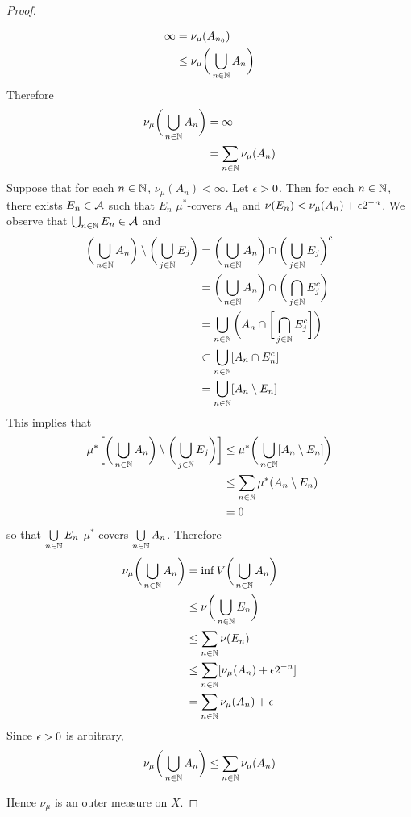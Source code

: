 \documentclass{book}
\begin{document}
\begin{proof}
\begin{enumerate}
\begin{align*}
				\infty 
				& = \nu_{\mu}(A_{n_0}) \\
				& \leq \nu_{\mu}\bigg(  \bigcup\limits_{n \in \mathbb{N}}A_n \bigg)
			\end{align*}
			Therefore
			\begin{align*}
				\nu_{\mu} \bigg( \bigcup_{n \in \mathbb{N}} A_n \bigg)
				& = \infty \\
				& = \sum_{n \in \mathbb{N}} \nu_{\mu}(A_n)
			\end{align*}
			Suppose that for each $n \in \mathbb{N}$, $\nu_{\mu}(A_n) < \infty$. Let $\epsilon > 0$. Then for each $n \in \mathbb{N}$, there exists $E_n \in \mathcal{A}$ such that $E_n$ $\mu^*$-covers $A_n$ and $\nu(E_n) < \nu_{\mu}(A_n) + \epsilon 2^{-n}$. We observe that $\bigcup_{n \in \mathbb{N}} E_n \in \mathcal{A}$ and 
			\begin{align*}
				\bigg( \bigcup_{n \in \mathbb{N}} A_n \bigg)  \setminus  \bigg( \bigcup_{j \in \mathbb{N}} E_j \bigg)
				& =  \bigg( \bigcup_{n \in \mathbb{N}} A_n \bigg) \cap 	\bigg( \bigcup_{j \in \mathbb{N}} E_j \bigg)^c \\
				& =  \bigg( \bigcup_{n \in \mathbb{N}} A_n \bigg) \cap 	\bigg( \bigcap_{j \in \mathbb{N}} E_j^c \bigg) \\
				& =  \bigcup_{n \in \mathbb{N}}  \bigg( A_n  \cap \bigg[ \bigcap_{j \in \mathbb{N}} E_j^c \bigg] \bigg) \\
				& \subset \bigcup_{n \in \mathbb{N}}  [ A_n  \cap E_n^c ] \\
				& = \bigcup_{n \in \mathbb{N}}  [ A_n  \setminus E_n ] \\
			\end{align*}
			This implies that 
			\begin{align*}
				\mu^* \bigg[ \bigg( \bigcup_{n \in \mathbb{N}} A_n \bigg)  \setminus  \bigg( \bigcup_{j \in \mathbb{N}} E_j \bigg) \bigg]
				& \leq \mu^* \bigg( \bigcup_{n \in \mathbb{N}}  [ A_n  \setminus E_n ] \bigg)  \\ 
				& \leq \sum_{n \in \mathbb{N}} \mu^*(A_n \setminus E_n) \\
				& = 0
			\end{align*}
			so that $ \bigcup\limits_{n \in \mathbb{N}} E_n$ $\mu^*$-covers $\bigcup\limits_{n \in \mathbb{N}} A_n$. Therefore 
			\begin{align*}
				\nu_{\mu} \bigg( \bigcup_{n \in \mathbb{N}} A_n \bigg) 
				& = \inf V \bigg( \bigcup_{n \in \mathbb{N}} A_n \bigg) \\  
				& \leq \nu \bigg( \bigcup_{n \in \mathbb{N}} E_n \bigg) \\
				& \leq \sum_{n \in \mathbb{N}} \nu(E_n) \\
				& \leq \sum_{n \in \mathbb{N}} [\nu_{\mu}(A_n) + \epsilon 2^{-n}] \\
				& = \sum_{n \in \mathbb{N}} \nu_{\mu}(A_n) + \epsilon 
			\end{align*}
			Since $\epsilon >0$ is arbitrary, 
			$$ \nu_{\mu} \bigg( \bigcup_{n \in \mathbb{N}} A_n \bigg)  \leq \sum_{n \in \mathbb{N}} \nu_{\mu}(A_n) $$
		\end{enumerate} 
		Hence $\nu_{\mu}$ is an outer measure on $X$.
	\end{proof}
\end{document}
